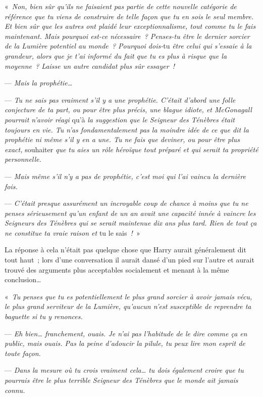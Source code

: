 «~\emph{Non, bien sûr qu'ils ne faisaient pas partie de cette nouvelle catégorie de référence que tu viens de construire de telle façon que tu en sois le seul membre. Et bien sûr que les autres ont plaidé leur exceptionnalisme, tout comme tu le fais maintenant. Mais pourquoi est-ce nécessaire~? Penses-tu être le dernier sorcier de la Lumière potentiel au monde~? Pourquoi dois-}tu \emph{être celui qui s'essaie à la grandeur, alors que je t'ai informé du fait que tu es plus à risque que la moyenne~? Laisse un autre candidat plus sûr essayer~!}

--- \emph{Mais la prophétie…}

--- \emph{Tu ne sais pas vraiment s'il y a une prophétie. C'était d'abord une folle conjecture de ta part, ou pour être plus précis, une blague idiote, et McGonagall pourrait n'avoir réagi} qu'à \emph{la suggestion que le Seigneur des Ténèbres était toujours en vie. Tu n'as fondamentalement pas la moindre idée de ce que dit la prophétie ni même s'il y en a une. Tu ne fais que deviner, ou pour être plus exact,} souhaiter \emph{que tu aies un rôle héroïque tout préparé et qui serait ta propriété personnelle.}

--- \emph{Mais même s'il n'y a pas de prophétie, c'est moi qui l'ai vaincu la dernière fois.}

--- \emph{C'était presque assurément un incroyable coup de chance à moins que tu ne penses sérieusement qu'un enfant de un an avait une capacité innée à vaincre les Seigneurs des Ténèbres qui se serait maintenue dix ans plus tard. Rien de tout ça ne constitue ta vraie raison et} tu le sais\emph{~!}~»

La réponse à cela n'était pas quelque chose que Harry aurait généralement dit tout haut~; lors d'une conversation il aurait dansé d'un pied sur l'autre et aurait trouvé des arguments plus acceptables socialement et menant à la même conclusion…

«~\emph{Tu penses que tu es potentiellement le plus grand sorcier à avoir jamais vécu, le plus grand serviteur de la Lumière, qu'aucun n'est susceptible de reprendre ta baguette si tu y renonces.}

--- \emph{Eh bien… franchement, ouais. Je n'ai pas l'habitude de le dire comme ça en public, mais ouais. Pas la peine d'adoucir la pilule, tu peux lire mon esprit de toute façon.}

--- \emph{Dans la mesure où tu crois vraiment cela… tu dois également croire que tu pourrais être le plus terrible Seigneur des Ténèbres que le monde ait jamais connu.}

